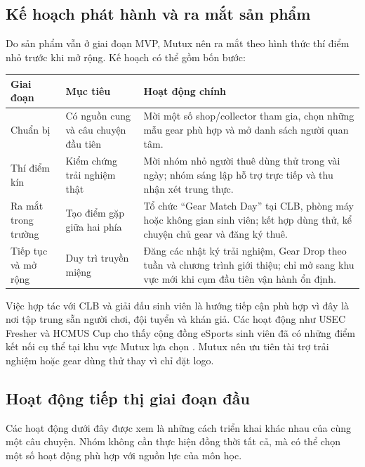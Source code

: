\subsection{Kế hoạch phát hành và ra mắt sản phẩm}

Do sản phẩm vẫn ở giai đoạn MVP, Mutux nên ra mắt theo hình thức thí điểm nhỏ trước khi mở rộng. Kế hoạch có thể gồm bốn bước:

\begin{longtable}{@{}p{}p{}p{}@{}}
\toprule
\textbf{Giai đoạn} & \textbf{Mục tiêu} & \textbf{Hoạt động chính} \\
\midrule
\endhead
Chuẩn bị & Có nguồn cung và câu chuyện đầu tiên & Mời một số shop/collector tham gia, chọn những mẫu gear phù hợp và mở danh sách người quan tâm. \\
Thí điểm kín & Kiểm chứng trải nghiệm thật & Mời nhóm nhỏ người thuê dùng thử trong vài ngày; nhóm sáng lập hỗ trợ trực tiếp và thu nhận xét trung thực. \\
Ra mắt trong trường & Tạo điểm gặp giữa hai phía & Tổ chức ``Gear Match Day'' tại CLB, phòng máy hoặc không gian sinh viên; kết hợp dùng thử, kể chuyện chủ gear và đăng ký thuê. \\
Tiếp tục và mở rộng & Duy trì truyền miệng & Đăng các nhật ký trải nghiệm, Gear Drop theo tuần và chương trình giới thiệu; chỉ mở sang khu vực mới khi cụm đầu tiên vận hành ổn định. \\
\bottomrule
\end{longtable}

Việc hợp tác với CLB và giải đấu sinh viên là hướng tiếp cận phù hợp vì đây là nơi tập trung sẵn người chơi, đội tuyển và khán giả. Các hoạt động như USEC Fresher và HCMUS Cup cho thấy cộng đồng eSports sinh viên đã có những điểm kết nối cụ thể tại khu vực Mutux lựa chọn \cite{vngUsecFresher2025,vngHcmusCup2026}. Mutux nên ưu tiên tài trợ trải nghiệm hoặc gear dùng thử thay vì chỉ đặt logo.

\subsection{Hoạt động tiếp thị giai đoạn đầu}

Các hoạt động dưới đây được xem là những cách triển khai khác nhau của cùng một câu chuyện. Nhóm không cần thực hiện đồng thời tất cả, mà có thể chọn một số hoạt động phù hợp với nguồn lực của môn học.

